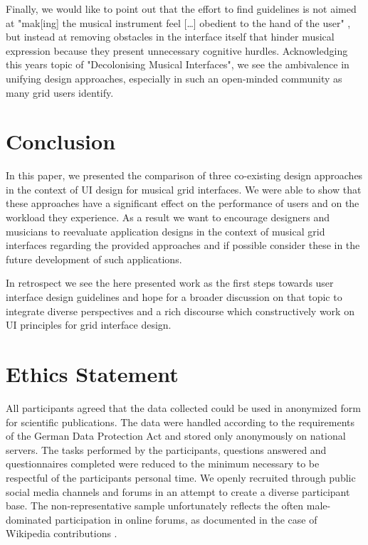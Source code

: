 \documentclass[sigconf]{nimeart}
\begin{document}
Finally, we would like to point out that the effort to find guidelines is not aimed at "mak{[}ing{]} the musical instrument feel {[}\ldots{]} \textquotesingle obedient to the hand of the user\textquotesingle" \cite{Simon2018}, but instead at removing obstacles in the interface itself that hinder musical expression because they present unnecessary cognitive hurdles. Acknowledging this years topic of "Decolonising Musical Interfaces", we see the ambivalence in unifying design approaches, especially in such an open-minded community as many grid users identify.

\section{Conclusion}\label{conclusion}

In this paper, we presented the comparison of three co-existing design approaches in the context of UI design for musical grid interfaces. We were able to show that these approaches have a significant effect on the performance of users and on the workload they experience. As a result we want to encourage designers and musicians to reevaluate application designs in the context of musical grid interfaces regarding the provided approaches and if possible consider these in the future development of such applications.

In retrospect we see the here presented work as the first steps towards user interface design guidelines and hope for a broader discussion on that topic to integrate diverse perspectives and a rich discourse which constructively work on UI principles for grid interface design.

\section{Ethics Statement}\label{ethics-statement}

All participants agreed that the data collected could be used in anonymized form for scientific publications. The data were handled according to the requirements of the German Data Protection Act and stored only anonymously on national servers. The tasks performed by the participants, questions answered and questionnaires completed were reduced to the minimum necessary to be respectful of the participants\textquotesingle{} personal time. We openly recruited through public social media channels and forums in an attempt to create a diverse participant base. The non-representative sample unfortunately reflects the often male-dominated participation in online forums, as documented in the case of Wikipedia contributions \cite{Hill2013}.



\end{document}
